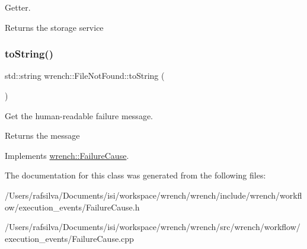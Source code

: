 Getter. 

\begin{DoxyReturn}{Returns}
the storage service 
\end{DoxyReturn}
\mbox{\label{classwrench_1_1_file_not_found_ac9c3bdcc58b4626a0f3de0b4288bf4b4}} 
\subsubsection{\texorpdfstring{to\+String()}{toString()}}
{\footnotesize\ttfamily std\+::string wrench\+::\+File\+Not\+Found\+::to\+String (\begin{DoxyParamCaption}{ }\end{DoxyParamCaption})\hspace{0.3cm}{\ttfamily [virtual]}}



Get the human-\/readable failure message. 

\begin{DoxyReturn}{Returns}
the message 
\end{DoxyReturn}


Implements \hyperlink{classwrench_1_1_failure_cause_afbad248ebe902409f2cd4f1d6f2b867d}{wrench\+::\+Failure\+Cause}.



The documentation for this class was generated from the following files\+:\begin{DoxyCompactItemize}
\item 
/\+Users/rafsilva/\+Documents/isi/workspace/wrench/wrench/include/wrench/workflow/execution\+\_\+events/Failure\+Cause.\+h\item 
/\+Users/rafsilva/\+Documents/isi/workspace/wrench/wrench/src/wrench/workflow/execution\+\_\+events/Failure\+Cause.\+cpp\end{DoxyCompactItemize}
